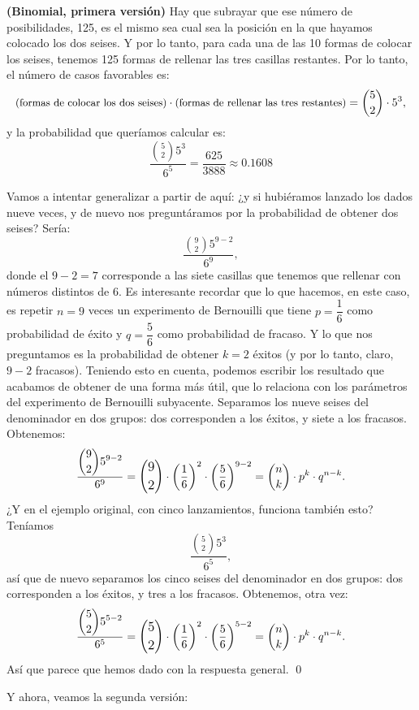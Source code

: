 \begin{Ejemplo}{\bf (Binomial, primera versión)}
    Hay que subrayar que ese número de posibilidades, 125, es el mismo sea cual sea la posición en la que hayamos colocado los dos seises. Y por lo tanto, para cada una de las 10 formas de colocar los seises, tenemos 125 formas de rellenar las tres casillas restantes. Por lo tanto, el número de casos favorables es:
        \[\small\mbox{(formas de colocar los dos seises)}\cdot\mbox{(formas de rellenar las tres  restantes)}=\binom{5}{2} \cdot 5^3,\]
    y la probabilidad que queríamos calcular es:
         \[\dfrac{\displaystyle\binom{5}{2}5^3}{6^5}=\dfrac{625}{3888}\approx 0.1608\]

     Vamos a intentar generalizar a partir de aquí: ¿y si hubiéramos lanzado los dados nueve veces, y de nuevo nos preguntáramos por la probabilidad de obtener dos seises? Sería:
     \[\dfrac{\displaystyle\binom{9}{2}5^{9-2}}{6^9},\]
     donde el $9-2=7$ corresponde a las siete casillas que tenemos que rellenar con números distintos de $6$. Es interesante recordar que lo que hacemos, en este caso, es repetir $n=9$ veces un experimento de Bernouilli que tiene $p=\dfrac{1}{6}$ como probabilidad de éxito y $q=\dfrac{5}{6}$ como probabilidad de fracaso. Y lo que nos preguntamos es la probabilidad de obtener $k=2$ éxitos (y por lo tanto, claro, $9-2$ fracasos). Teniendo esto en cuenta, podemos escribir los resultado que acabamos de obtener de una forma más útil, que lo relaciona con los parámetros del experimento de Bernouilli subyacente. Separamos los nueve seises del denominador en dos grupos: dos corresponden a los éxitos, y siete a los fracasos. Obtenemos:
     \[\dfrac{\displaystyle\binom{9}{2}5^{9-2}}{6^9}=
     \mbox{\large $ \displaystyle\binom{9}{2}$}\cdot\left(\dfrac{1}{6}\right)^2\cdot\left(\dfrac{5}{6}\right)^{9-2}=
     \binom{n}{k}\cdot p^k\cdot q^{n-k}.
     \]
     ¿Y en el ejemplo original, con cinco lanzamientos, funciona también esto? Teníamos
     \[\dfrac{\displaystyle\binom{5}{2}5^3}{6^5},\]
     así que de nuevo separamos los cinco seises del denominador en dos grupos: dos corresponden a los éxitos, y tres a los fracasos. Obtenemos, otra vez:
     \[\dfrac{\displaystyle\binom{5}{2}5^{5-2}}{6^5}=
     \mbox{\large $ \displaystyle\binom{5}{2}$}\cdot\left(\dfrac{1}{6}\right)^2\cdot\left(\dfrac{5}{6}\right)^{5-2}=
     \binom{n}{k}\cdot p^k\cdot q^{n-k}.
     \]
     Así que parece que hemos dado con la respuesta general.
     \quad\qed
\end{Ejemplo}

\noindent Y ahora, veamos la segunda versión:

